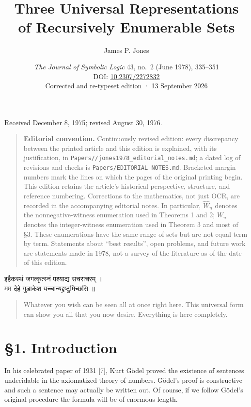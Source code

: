 \documentclass[11pt,a4paper]{article}
\title{\LARGE\bfseries Three Universal Representations\\of Recursively Enumerable Sets}
\author{James P. Jones}
\date{\small\textit{The Journal of Symbolic Logic} 43, no.\ 2 (June 1978), 335--351\\
\small DOI: \href{https://doi.org/10.2307/2272832}{10.2307/2272832}\\[6pt]
\small Corrected and re-typeset edition · 13 September 2026}
\newcommand{\origpage}[1]{\marginnote{\footnotesize\textbf{[#1]}}}
\newcommand{\WW}{\widehat W}
\begin{document}
\maketitle
\begin{center}\small
Received December 8, 1975; revised August 30, 1976.
\end{center}
\begin{quote}\small
\textbf{Editorial convention.} Continuously revised edition: every discrepancy between the printed article and this edition is explained, with its justification, in \texttt{Papers//\allowbreak jones1978\_\allowbreak editorial\_\allowbreak notes.md}; a dated log of revisions and checks is \texttt{Papers/\allowbreak EDITORIAL\_NOTES.md}. Bracketed margin numbers mark the lines on which the pages of the original printing begin. This edition retains the article's historical perspective,
structure, and reference numbering. Corrections to the mathematics, not just OCR,
are recorded in the accompanying editorial notes. In particular, $\WW_n$ denotes
the nonnegative-witness enumeration used in Theorems 1 and 2; $W_n$ denotes the
integer-witness enumeration used in Theorem 3 and most of \S3. These enumerations
have the same range of sets but are not equal term by term. Statements about
``best results'', open problems, and future work are statements made in 1978,
not a survey of the literature as of the date of this edition.
\end{quote}
\begin{center}
{\devanagarifont\large इहैकस्थं जगत्कृत्स्नं पश्याद्य सचराचरम् ।\\
मम देहे गुडाकेश यच्चान्यद्द्रष्टुमिच्छसि ॥}\footnotemark[1]
\end{center}
\begin{quote}\small
Whatever you wish can be seen all at once right here. This universal form can show
you all that you now desire. Everything is here completely.\footnotemark[2]
\end{quote}
\setcounter{footnote}{2}
\section*{§1. Introduction} \origpage{335}In his celebrated paper of 1931 [7], Kurt Gödel proved the existence of sentences undecidable in the axiomatized theory of numbers. Gödel's proof is constructive and such a sentence may actually be written out. Of course, if we follow Gödel's original procedure the formula will be of enormous length.
\end{document}
